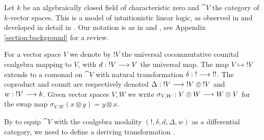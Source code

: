 \documentclass[english,letter paper,12pt,reqno]{article}
\theoremstyle{example}
\begin{document}
Let $k$ be an algebraically closed field of characteristic zero and $\cat{V}$ the category of $k$-vector spaces. This is a model of intuitionistic linear logic, as observed in \cite[p.5]{hyland} and developed in detail in \cite{murfet_ll}. Our notation is as in \cite{murfet_coalg} and \cite[\S 5]{murfet_ll}, see Appendix \ref{section:background} for a review. 

For a vector space $V$ we denote by ${!} V$ the universal cocommutative counital coalgebra mapping to $V$, with $d: {!} V \longrightarrow V$ the universal map. The map $V \mapsto {!} V$ extends to a comonad on $\cat{V}$ with natural transformation $\delta: {!} \longrightarrow {!} {!}$. The coproduct and counit are respectively denoted $\Delta: {!} V \longrightarrow {!} V \otimes {!} V$ and $w: {!} V \longrightarrow k$. Given vector spaces $V,W$ we write $\sigma_{V,W}: V \otimes W \longrightarrow W \otimes V$ for the swap map $\sigma_{V,W}(x \otimes y) = y \otimes x$.

By \cite[Proposition 2.6]{blutecs} to equip $\cat{V}$ with the coalgebra modality $({!}, \delta, d, \Delta, w)$ as a differential category, we need to define a deriving transformation \cite[Definition 2.5]{blutecs}. 
\end{document}
